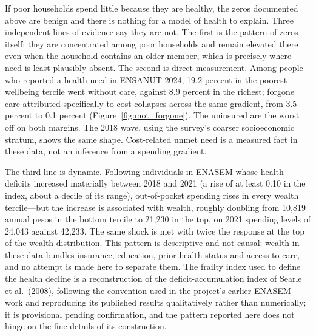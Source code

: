 If poor households spend little because they are healthy, the zeros documented
above are benign and there is nothing for a model of health to explain. Three
independent lines of evidence say they are not. The first is the pattern of
zeros itself: they are concentrated among poor households and remain elevated
there even when the household contains an older member, which is precisely where
need is least plausibly absent. The second is direct measurement. Among people
who reported a health need in ENSANUT 2024, 19.2 percent in the poorest
wellbeing tercile went without care, against 8.9 percent in the richest; forgone
care attributed specifically to cost collapses across the same gradient, from
3.5 percent to 0.1 percent (Figure~\ref{fig:mot_forgone}). The uninsured are the
worst off on both margins. The 2018 wave, using the survey's coarser
socioeconomic stratum, shows the same shape. Cost-related unmet need is a
measured fact in these data, not an inference from a spending gradient.

The third line is dynamic. Following individuals in ENASEM whose health deficits
increased materially between 2018 and 2021 (a rise of at least 0.10 in the
index, about a decile of its range), out-of-pocket spending rises in every
wealth tercile---but the increase is associated with wealth, roughly doubling
from 10{,}819 annual pesos in the bottom tercile to 21{,}230 in the top, on
2021 spending levels of 24{,}043 against 42{,}233. The same shock is met with
twice the response at the top of the wealth distribution. This pattern is
descriptive and not causal: wealth in these data bundles insurance, education,
prior health status and access to care, and no attempt is made here to separate
them. The frailty index used to define the health decline is a reconstruction of
the deficit-accumulation index of Searle et al.\ (2008), following the
convention used in the project's earlier ENASEM work and reproducing its
published results qualitatively rather than numerically; it is provisional
pending confirmation, and the pattern reported here does not hinge on the fine
details of its construction.
%

